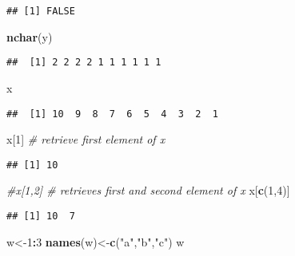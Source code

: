 \documentclass[
]{article}
\newenvironment{Shaded}{\begin{snugshade}}{\end{snugshade}}
\newcommand{\CommentTok}[1]{\textcolor[rgb]{0.56,0.35,0.01}{\textit{#1}}}
\newcommand{\DecValTok}[1]{\textcolor[rgb]{0.00,0.00,0.81}{#1}}
\newcommand{\FunctionTok}[1]{\textcolor[rgb]{0.13,0.29,0.53}{\textbf{#1}}}
\newcommand{\NormalTok}[1]{#1}
\newcommand{\OtherTok}[1]{\textcolor[rgb]{0.56,0.35,0.01}{#1}}
\newcommand{\SpecialCharTok}[1]{\textcolor[rgb]{0.81,0.36,0.00}{\textbf{#1}}}
\newcommand{\StringTok}[1]{\textcolor[rgb]{0.31,0.60,0.02}{#1}}
\begin{document}
\begin{verbatim}
## [1] FALSE
\end{verbatim}

\begin{Shaded}
\begin{Highlighting}[]
\FunctionTok{nchar}\NormalTok{(y)}
\end{Highlighting}
\end{Shaded}

\begin{verbatim}
##  [1] 2 2 2 2 1 1 1 1 1 1
\end{verbatim}

\begin{Shaded}
\begin{Highlighting}[]
\NormalTok{x}
\end{Highlighting}
\end{Shaded}

\begin{verbatim}
##  [1] 10  9  8  7  6  5  4  3  2  1
\end{verbatim}

\begin{Shaded}
\begin{Highlighting}[]
\NormalTok{x[}\DecValTok{1}\NormalTok{] }\CommentTok{\# retrieve first element of x}
\end{Highlighting}
\end{Shaded}

\begin{verbatim}
## [1] 10
\end{verbatim}

\begin{Shaded}
\begin{Highlighting}[]
\CommentTok{\#x[1,2] \# retrieves first and second element of x}
\NormalTok{x[}\FunctionTok{c}\NormalTok{(}\DecValTok{1}\NormalTok{,}\DecValTok{4}\NormalTok{)]}
\end{Highlighting}
\end{Shaded}

\begin{verbatim}
## [1] 10  7
\end{verbatim}

\begin{Shaded}
\begin{Highlighting}[]
\NormalTok{w}\OtherTok{\textless{}{-}}\DecValTok{1}\SpecialCharTok{:}\DecValTok{3}
\FunctionTok{names}\NormalTok{(w)}\OtherTok{\textless{}{-}}\FunctionTok{c}\NormalTok{(}\StringTok{"a"}\NormalTok{,}\StringTok{"b"}\NormalTok{,}\StringTok{"c"}\NormalTok{)}
\NormalTok{w}
\end{Highlighting}
\end{Shaded}
\end{document}
